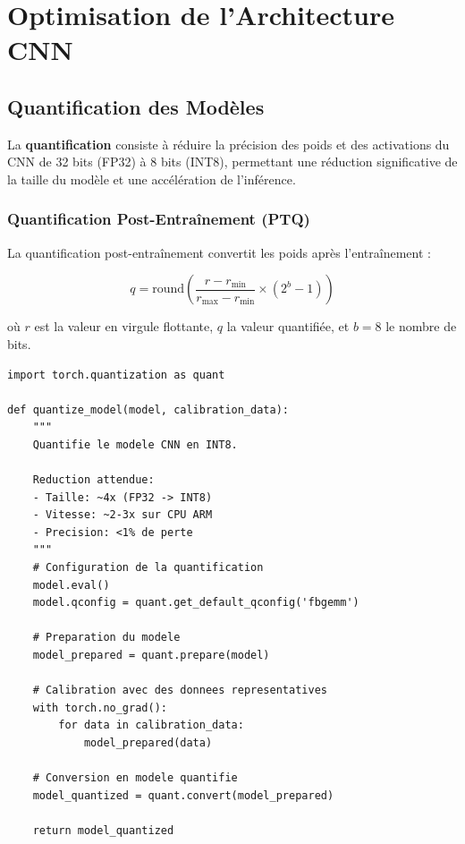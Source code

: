 \documentclass[12pt,a4paper,twoside]{report}
\newcommand{\keyword}[1]{\textbf{\textcolor{stellantisblue}{#1}}}
\begin{document}
\section{Optimisation de l'Architecture CNN}

\subsection{Quantification des Modèles}

La \keyword{quantification} consiste à réduire la précision des poids et des activations du CNN de 32 bits (FP32) à 8 bits (INT8), permettant une réduction significative de la taille du modèle et une accélération de l'inférence.

\subsubsection{Quantification Post-Entraînement (PTQ)}

La quantification post-entraînement convertit les poids après l'entraînement :

\begin{equation}
q = \text{round}\left(\frac{r - r_{\min}}{r_{\max} - r_{\min}} \times (2^b - 1)\right)
\label{eq:quantization}
\end{equation}

où $r$ est la valeur en virgule flottante, $q$ la valeur quantifiée, et $b = 8$ le nombre de bits.

\begin{lstlisting}[style=pythonstyle, caption={Quantification du modèle avec PyTorch.}, label={lst:quantization}]
import torch.quantization as quant

def quantize_model(model, calibration_data):
    """
    Quantifie le modele CNN en INT8.
    
    Reduction attendue:
    - Taille: ~4x (FP32 -> INT8)
    - Vitesse: ~2-3x sur CPU ARM
    - Precision: <1% de perte
    """
    # Configuration de la quantification
    model.eval()
    model.qconfig = quant.get_default_qconfig('fbgemm')
    
    # Preparation du modele
    model_prepared = quant.prepare(model)
    
    # Calibration avec des donnees representatives
    with torch.no_grad():
        for data in calibration_data:
            model_prepared(data)
    
    # Conversion en modele quantifie
    model_quantized = quant.convert(model_prepared)
    
    return model_quantized
\end{lstlisting}
\end{document}
